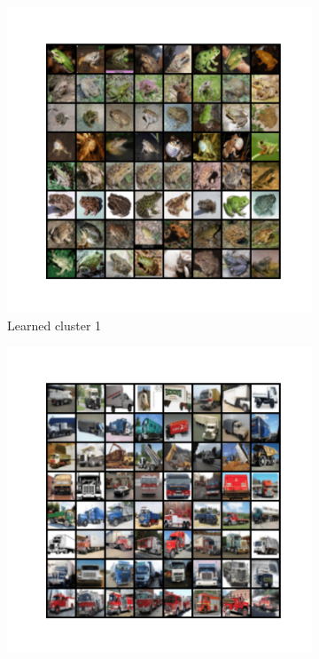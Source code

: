 \documentclass[10pt,twocolumn,letterpaper]{article}
\begin{document}
   \begin{figure}
     \centering
     \begin{subfigure}{0.32\textwidth}
       \includegraphics[width=\linewidth,trim={2cm 2cm 2cm 2cm},clip]{figures/experiments/cifar10_cluster/nearest_class0.png}
       \caption{Learned cluster 1}
       \label{fig:cifar10-1}
     \end{subfigure}
     \hfill
     \begin{subfigure}{0.32\textwidth}
       \includegraphics[width=\linewidth,trim={2cm 2cm 2cm 2cm},clip]{figures/experiments/cifar10_cluster/nearest_class1.png}

\end{subfigure}
\end{figure}
\end{document}

